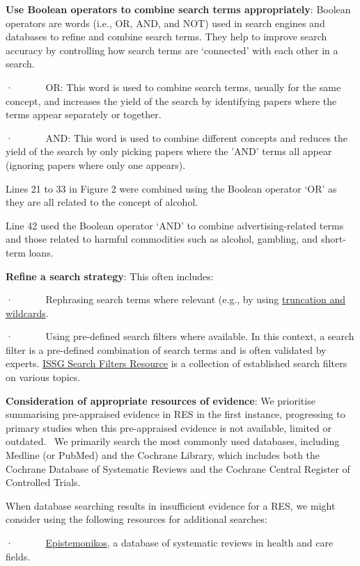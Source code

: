 \documentclass[
  letterpaper,
  DIV=11,
  numbers=noendperiod]{scrreprt}
\begin{document}
\textbf{Use Boolean operators to combine search terms appropriately}:
Boolean operators are words (i.e., OR, AND, and NOT) used in search
engines and databases to refine and combine search terms. They help to
improve search accuracy by controlling how search terms are `connected'
with each other in a search.

·~~~~~~ OR: This word is used to combine search terms, usually for the
same concept, and increases the yield of the search by identifying
papers where the terms appear separately or together.

·~~~~~~ AND: This word is used to combine different concepts and reduces
the yield of the search by only picking papers where the 'AND' terms all
appear (ignoring papers where only one appears).

Lines 21 to 33 in Figure 2 were combined using the Boolean operator `OR'
as they are all related to the concept of alcohol.

Line 42 used the Boolean operator `AND' to combine advertising-related
terms and those related to harmful commodities such as alcohol,
gambling, and short-term loans.

\textbf{Refine a search strategy}: This often includes:

·~~~~~~ Rephrasing search terms where relevant (e.g., by using
\href{https://hslmcmaster.libguides.com/srm/truncation}{truncation and
wildcards}.

·~~~~~~ Using pre-defined search filters where available. In this
context, a search filter is a pre-defined combination of search terms
and is often validated by experts.
\href{https://sites.google.com/a/york.ac.uk/issg-search-filters-resource/home}{ISSG
Search Filters Resource} is a collection of established search filters
on various topics.

\textbf{Consideration of appropriate resources of evidence}: We
prioritise summarising pre-appraised evidence in RES in the first
instance, progressing to primary studies when this pre-appraised
evidence is not available, limited or outdated. ~We primarily search the
most commonly used databases, including Medline (or PubMed) and the
Cochrane Library, which includes both the Cochrane Database of
Systematic Reviews and the Cochrane Central Register of Controlled
Trials.

When database searching results in insufficient evidence for a RES, we
might consider using the following resources for additional searches:

·~~~~~~ \href{https://www.epistemonikos.org/en/}{Epistemonikos}, a
database of systematic reviews in health and care fields.
\end{document}
